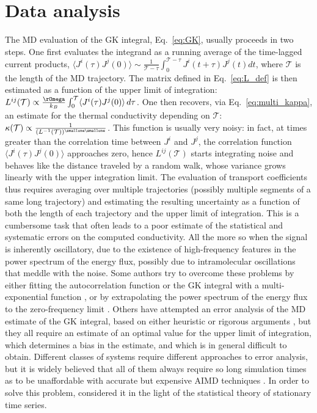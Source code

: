 \section{Data analysis} \label{sec:data-analysis}
The MD evaluation of the GK integral, Eq.~\eqref{eq:GK}, usually proceeds in two steps. One first evaluates the integrand as a running average of the time-lagged current products, $\langle J^i(\tau)J^j(0)\rangle \sim \frac{1}{\mathcal{T}-\tau} \int_0^{\mathcal{T}-\tau} J^i(t+\tau)J^j(t)dt$, where $\mathcal{T}$ is the length of the MD trajectory.
The matrix defined in Eq.~\eqref{eq:L_def} is then estimated as a function of the upper limit of integration:  $L^{ij}(\mathcal{T})\propto \frac{\rOmega}{k_B} \int_0^\mathcal{T} \langle J^i(\tau)J^j(0)\rangle \,d\tau$. One then recovers, via Eq.~\eqref{eq:multi_kappa}, an estimate for the thermal conductivity depending on $\mathcal{T}$:
$\kappa(\mathcal{T})\propto \frac{1}{(L^{-1}(\mathcal{T}))^{\smallone\smallone}}$.
This function is usually very noisy: in fact, at times greater than the correlation time between $J^i$ and $J^j$, the correlation function $\langle J^i(\tau)J^j(0)\rangle$ approaches zero, hence $L^{ij}(\mathcal{T})$ starts integrating noise and behaves like the distance traveled by a random walk, whose variance grows linearly with the upper integration limit.
The evaluation of transport coefficients thus requires averaging over multiple trajectories (possibly multiple segments of a same long trajectory) and estimating the resulting uncertainty as a function of both the length of each trajectory and the upper limit of integration. This is a cumbersome task that often leads to a poor estimate of the statistical and systematic errors on the computed conductivity. All the more so when the signal is inherently oscillatory, due to the existence of high-frequency features in the power spectrum of the energy flux, possibly due to intramolecular oscillations that meddle with the noise. Some authors try to overcome these problems by either fitting the autocorrelation function or the GK integral with a multi-exponential function \citep{Schelling2002,Zhang2015}, or by extrapolating the power spectrum of the energy flux to the zero-frequency limit \citep{Volz2000}. Others have attempted an error analysis of the MD estimate of the GK integral, based on either heuristic or rigorous arguments \citep{Jones2012,Wang_gk2017,Oliveira2017}, but they all require an estimate of an optimal value for the upper limit of integration, which determines a bias in the estimate, and which is in general difficult to obtain. Different classes of systems require different approaches to error analysis, but it is widely believed that all of them always require so long simulation times as to be unaffordable with accurate but expensive AIMD techniques \citep{Carbogno:2017gc}. In order to solve this problem, \cite{Ercole2017} considered it in the light of the statistical theory of stationary time series.



